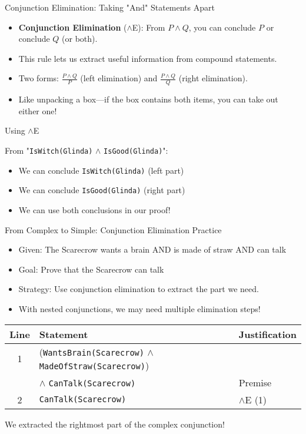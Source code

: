 \documentclass{beamer}
\begin{document}
	\begin{frame}{Conjunction Elimination: Taking "And" Statements Apart}
		\begin{itemize}
			\item \textbf{Conjunction Elimination} ($\land$E): From $P \land Q$, you can conclude $P$ or conclude $Q$ (or both).
			\item This rule lets us extract useful information from compound statements.
			\item Two forms: $\frac{P \land Q}{P}$ (left elimination) and $\frac{P \land Q}{Q}$ (right elimination).
			\item Like unpacking a box—if the box contains both items, you can take out either one!
		\end{itemize}
		
		\begin{alertblock}{Using $\land$E}
			\scriptsize{
			From "\texttt{IsWitch(Glinda)} $\land$ \texttt{IsGood(Glinda)}":
			\begin{itemize}
				\item We can conclude \texttt{IsWitch(Glinda)} (left part)
				\item We can conclude \texttt{IsGood(Glinda)} (right part)
				\item We can use both conclusions in our proof!
			\end{itemize}
		}
		\end{alertblock}
	\end{frame}
	\begin{frame}{From Complex to Simple: Conjunction Elimination Practice}
		\begin{itemize}
			\item Given: The Scarecrow wants a brain AND is made of straw AND can talk
			\item Goal: Prove that the Scarecrow can talk
			\item Strategy: Use conjunction elimination to extract the part we need.
			\item With nested conjunctions, we may need multiple elimination steps!
		\end{itemize}
		
		\begin{example}
			\begin{tabular}{|c|l|l|}
				\hline
				\textbf{Line} & \textbf{Statement} & \textbf{Justification} \\
				\hline
				1 & (\texttt{WantsBrain(Scarecrow)} $\land$ \texttt{MadeOfStraw(Scarecrow)}) & \\
				& $\land$ \texttt{CanTalk(Scarecrow)} & Premise \\
				2 & \texttt{CanTalk(Scarecrow)} & $\land$E (1) \\
				\hline
			\end{tabular}
			
			We extracted the rightmost part of the complex conjunction!
		\end{example}
	\end{frame}
	
\end{document}

